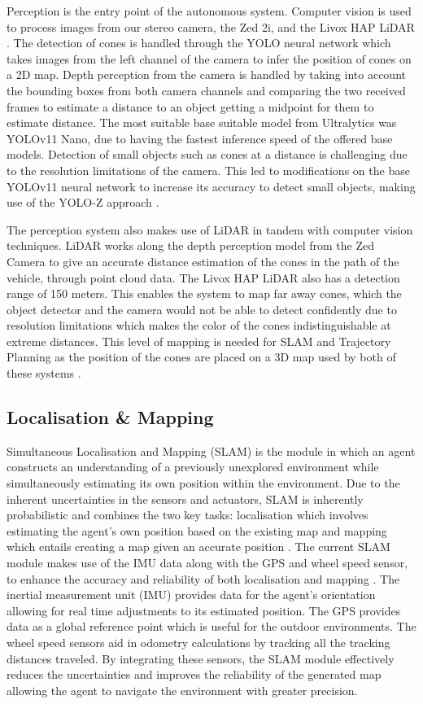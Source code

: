\documentclass[a4paper,11pt]{report}
\begin{document}
Perception is the entry point of the autonomous system. Computer vision is used to process images 
from our stereo camera, the Zed 2i, and the Livox HAP LiDAR \cite{reference27}. The detection of cones is handled through 
the YOLO neural network which takes images from the left channel of the camera to infer the position of 
cones on a 2D map. Depth perception from the camera is handled by taking into account the bounding boxes 
from both camera channels and comparing the two received frames to estimate a distance to an object 
getting a midpoint for them to estimate distance. The most suitable base suitable model from Ultralytics 
was YOLOv11 Nano, due to having the fastest inference speed of the offered base models. Detection of 
small objects such as cones at a distance is challenging due to the resolution limitations of the camera. 
This led to modifications on the base YOLOv11 neural network to increase its accuracy to detect small objects, making use of the YOLO-Z approach \cite{reference26}.

The perception system also makes use of LiDAR in tandem with computer vision techniques. 
LiDAR works along the depth perception model from the Zed Camera to give an accurate distance 
estimation of the cones in the path of the vehicle, through point cloud data. The Livox HAP LiDAR 
also has a detection range of 150 meters. This enables the system to map far away cones, which the 
object detector and the camera would not be able to detect confidently due to resolution limitations 
which makes the color of the cones indistinguishable at extreme distances. This level of mapping is needed 
for SLAM and Trajectory Planning as the position of the cones are placed on a 3D map used by both of these systems \cite{reference27}.

\subsection{Localisation \& Mapping}
Simultaneous Localisation and Mapping (SLAM) is the module in which an agent constructs an understanding 
of a previously unexplored environment while simultaneously estimating its own position within the environment. 
Due to the inherent uncertainties in the sensors and actuators, SLAM is inherently probabilistic and combines the 
two key tasks: localisation which involves estimating the agent's own position based on the existing map and mapping 
which entails creating a map given an accurate position \cite{reference6}. The current SLAM module makes use of the IMU data along with the 
GPS and wheel speed sensor, to enhance the accuracy and reliability of both localisation and mapping \cite{reference27}. 
The inertial measurement unit (IMU) provides data for the agent’s orientation allowing for real time 
adjustments to its estimated position. The GPS provides data as a global reference point which is useful 
for the outdoor environments. The wheel speed sensors aid in odometry calculations by tracking all the tracking 
distances traveled. By integrating these sensors, the SLAM module effectively reduces the uncertainties and improves 
the reliability of the generated map allowing the agent to navigate the environment with greater precision.
\end{document}

